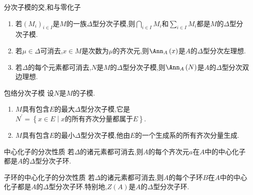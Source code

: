 \begin{proposition}{分次子模的交,和与零化子}{}
	\begin{enumerate}
		\item 若$\left(M_{i}\right)_{i\in I}$是$M$的一族$\Delta$型分次子模,则$\bigcap\limits_{i\in I}M_{i}$和$\sum\limits_{i\in I}M_{i}$都是$M$的$\Delta$型分次子模.
		\item 若$\mu\in\Delta$可消去,$x\in M$是次数为$\mu$的齐次元,则$\Ann_{A}\left(x\right)$是$A$的$\Delta$型分次左理想.
		\item 若$\Delta$的每个元素都可消去,$N$是$M$的$\Delta$型分次子模,则$\Ann_{A}\left(N\right)$是$A$的$\Delta$型分次双边理想.
	\end{enumerate}
\end{proposition}

\begin{remark}{包络分次子模}{}
	设$N$是$M$的子模.
	\begin{enumerate}
		\item $M$具有包含$E$的最大$\Delta$型分次子模,它是$N^{\prime}=\left\{x\in E\middle|x\text{的所有齐次分量都属于}E\right\}$.
		\item $M$具有包含$E$的最小$\Delta$型分次子模,他由$E$的一个生成系的所有齐次分量生成.
	\end{enumerate}
\end{remark}

\begin{proposition}{中心化子的分次性质}{}
	若$\Delta$的诸元素都可消去,则$A$的每个齐次元$a$在$A$中的中心化子都是$A$的$\Delta$型分次子环.
\end{proposition}

\begin{corollary}{子环的中心化子的分次性质}{}
	若$\Delta$的诸元素都可消去,则$A$的每个子环$B$在$A$中的中心化子都是$A$的$\Delta$型分次子环.特别地,$Z\left(A\right)$是$A$的$\Delta$型分次子环.
\end{corollary}